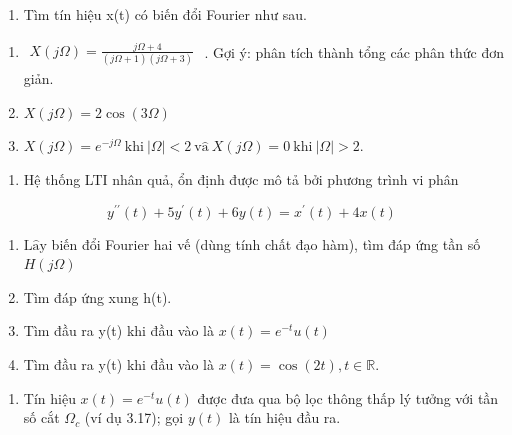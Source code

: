 \documentclass[
  10
]{article}
\providecommand{\tightlist}{%
  \setlength{\itemsep}{0pt}\setlength{\parskip}{0pt}}
\begin{document}
\begin{enumerate}
\def\labelenumi{\arabic{enumi}.}
\setcounter{enumi}{10}
\tightlist
\item
  Tìm tín hiệu x(t) có biến đổi Fourier như sau.
\end{enumerate}

\begin{enumerate}
\def\labelenumi{(\alph{enumi})}
\item
  \(\begin{array} { r } { X ( j \Omega ) = \frac { j \Omega + 4 } { ( j \Omega + 1 ) ( j \Omega + 3 ) } } \end{array}\)
  . Gợi ý: phân tích thành tổng các phân thức đơn giản.
\item
  \(X ( j \Omega ) = 2 \cos ( 3 \Omega )\)
\item
  \(X ( j \Omega ) = e ^ { - j \Omega } \mathrm { ~ k h i ~ } | \Omega | < 2 \mathrm { ~ v \hat { a } ~ } X ( j \Omega ) = 0 \mathrm { ~ k h i ~ } | \Omega | > 2 .\)
\end{enumerate}

\begin{enumerate}
\def\labelenumi{\arabic{enumi}.}
\setcounter{enumi}{11}
\tightlist
\item
  Hệ thống LTI nhân quả, ổn định được mô tả bởi phương trình vi phân
\end{enumerate}

\[
y ^ {\prime \prime} (t) + 5 y ^ {\prime} (t) + 6 y (t) = x ^ {\prime} (t) + 4 x (t)
\]

\begin{enumerate}
\def\labelenumi{(\alph{enumi})}
\item
  \(\mathrm { L } \mathrm { \hat { a } y }\) biến đổi Fourier hai vế
  (dùng tính chất đạo hàm), tìm đáp ứng tần số \(H ( j \Omega )\)
\item
  Tìm đáp ứng xung h(t).
\item
  Tìm đầu ra y(t) khi đầu vào là \(x ( t ) = e ^ { - t } u ( t )\)
\item
  Tìm đầu ra y(t) khi đầu vào là
  \(x ( t ) = \cos ( 2 t ) , t \in \mathbb { R } .\)
\end{enumerate}

\begin{enumerate}
\def\labelenumi{\arabic{enumi}.}
\setcounter{enumi}{12}
\tightlist
\item
  Tín hiệu \(x ( t ) = e ^ { - t } u ( t )\) được đưa qua bộ lọc thông
  thấp lý tưởng với tần số cắt \(\Omega _ { c }\) (ví dụ 3.17); gọi
  \(y ( t )\) là tín hiệu đầu ra.
\end{enumerate}
\end{document}
